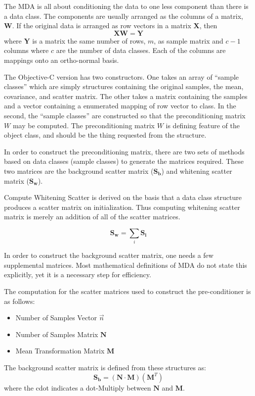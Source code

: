 \documentclass[12pt]{report}
\begin{document}
The MDA is all about conditioning the data to one less component than there is a data class.  The components are usually arranged as the columns of a matrix, $\mathbf{W}$.  If the original data is arranged as row vectors in a matrix $\mathbf{X}$, then
\begin{equation}
\mathbf{XW} = \mathbf{Y}
\end{equation}
where $\mathbf{Y}$ is a matrix the same number of rows, $m$, as sample matrix and $c-1$ columns where $c$ are the number of data classes.  Each of the columns are mappings onto an ortho-normal basis.  

The Objective-C version has two constructors.  One takes an array of ``sample classes'' which are simply structures containing the original samples, the mean, covariance, and scatter matrix.  The other takes a matrix containing the samples and a vector containing a enumerated mapping of row vector to class.    In the second, the ``sample classes'' are constructed so that the preconditioning matrix $W$ may be computed.  The preconditioning matrix $W$ is defining feature of the object class, and should be the thing requested from the structure.  

In order to construct the preconditioning matrix, there are two sets of methods based on data classes (sample classes) to generate the matrices required.  These two matrices are the background scatter matrix ($\mathbf{S_b}$) and whitening scatter matrix ($\mathbf{S_w}$).  

Compute Whitening Scatter is derived on the basis that a data class structure produces a scatter matrix on initialization.  Thus computing whitening scatter matrix is merely an addition of all of the scatter matrices.  

\begin{equation}
\mathbf{S_w} = \sum _i \mathbf{S_i}
\end{equation}

In order to construct the background scatter matrix, one needs a few supplemental matrices.  Most mathematical definitions of MDA do not state this explicitly, yet it is a necessary step for efficiency.  

The computation for the scatter matrices used to construct the pre-conditioner is as follows:
\begin{itemize}
	\item Number of Samples Vector $\vec{n}$
	\item Number of Samples Matrix $\mathbf{N}$
	\item Mean Transformation Matrix $\mathbf{M}$
\end{itemize}
The background scatter matrix is defined from these structures as:
\begin{equation}
	\mathbf{S_b} = (\mathbf{N} \cdot \mathbf{M})(\mathbf{M}^T) 
\end{equation}
where the cdot indicates a dot-Multiply between $\mathbf{N}$ and $\mathbf{M}$.  %
\end{document}
